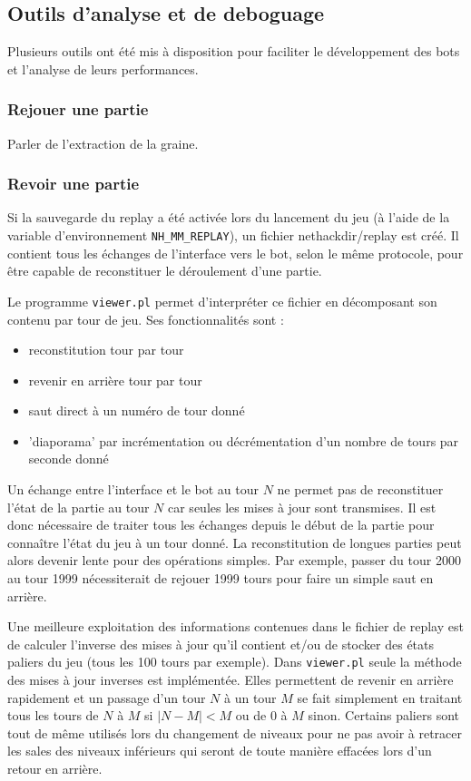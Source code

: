 \documentclass[a4paper,12pt]{article}
\begin{document}
\subsection{Outils d'analyse et de deboguage}

Plusieurs outils ont été mis à disposition pour faciliter le développement des bots et l'analyse de leurs performances.

\subsubsection{Rejouer une partie}

Parler de l'extraction de la graine.

\subsubsection{Revoir une partie}

	Si la sauvegarde du replay a été activée lors du lancement du jeu (à l'aide de la variable d'environnement \verb!NH_MM_REPLAY!), un fichier nethackdir/replay est créé. Il contient tous les échanges de l'interface vers le bot, selon le même protocole, pour être capable de reconstituer le déroulement d'une partie.

Le programme \verb!viewer.pl! permet d'interpréter ce fichier en décomposant son contenu par tour de jeu. Ses fonctionnalités sont :
\begin{itemize}
	\item reconstitution tour par tour
	\item revenir en arrière tour par tour
	\item saut direct à un numéro de tour donné
	\item 'diaporama' par incrémentation ou décrémentation d'un nombre de tours par seconde donné
\end{itemize}

Un échange entre l'interface et le bot au tour $N$ ne permet pas de reconstituer l'état de la partie au tour $N$ car seules les mises à jour sont transmises. Il est donc nécessaire de traiter tous les échanges depuis le début de la partie pour connaître l'état du jeu à un tour donné. La reconstitution de longues parties peut alors devenir lente pour des opérations simples. Par exemple, passer du tour 2000 au tour 1999 nécessiterait de rejouer 1999 tours pour faire un simple saut en arrière.

Une meilleure exploitation des informations contenues dans le fichier de replay est de calculer l'inverse des mises à jour qu'il contient et/ou de stocker des états paliers du jeu (tous les 100 tours par exemple). Dans \verb!viewer.pl! seule la méthode des mises à jour inverses est implémentée. Elles permettent de revenir en arrière rapidement et un passage d'un tour $N$ à un tour $M$ se fait simplement en traitant tous les tours de $N$ à $M$ si $|N-M| < M$ ou de $0$ à $M$ sinon. Certains paliers sont tout de même utilisés lors du changement de niveaux pour ne pas avoir à retracer les sales des niveaux inférieurs qui seront de toute manière effacées lors d'un retour en arrière.
\end{document}
